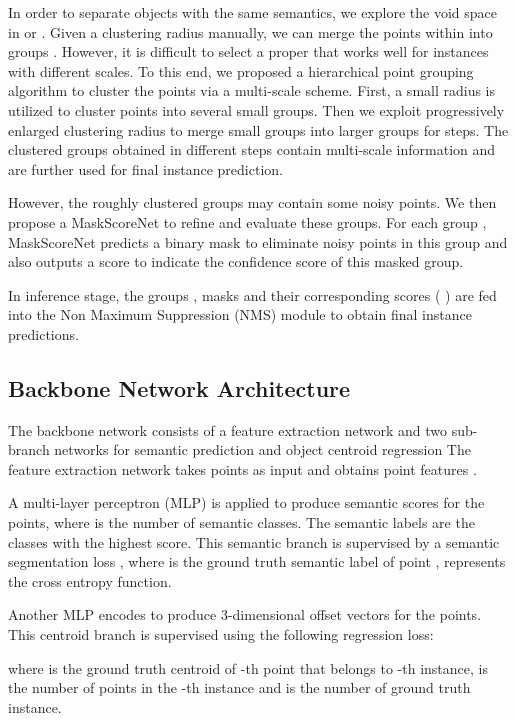 \documentclass{article}
\begin{document}
In order to separate objects with the same semantics, we explore the void space in  or .
Given a clustering radius  manually, we can merge the points within  into  groups .
However, it is difficult to select a proper  that works well for instances with different scales. 
To this end, we proposed a hierarchical point grouping algorithm to cluster the points via a multi-scale scheme. 
First, a small radius is utilized to cluster points into several small groups. Then we exploit progressively enlarged clustering radius to merge small groups into larger groups for   steps. 
The clustered groups  obtained in different steps contain multi-scale information and are further used for final instance prediction.

However, the roughly clustered groups  may contain some noisy points.
We then propose a MaskScoreNet to refine and evaluate these groups.
For each group , MaskScoreNet predicts a binary mask  to eliminate noisy points in this group and also outputs a score  to indicate the confidence score of this masked group.

In inference stage, the groups , masks  and their corresponding scores  ( ) are fed into the Non Maximum Suppression (NMS) module to obtain final instance predictions.

\subsection{Backbone Network Architecture}

The backbone network consists of a feature extraction network and two sub-branch networks for semantic prediction and object centroid regression
The feature extraction network takes points  as input and obtains point features .

A multi-layer perceptron (MLP) is applied to produce semantic scores  for the  points, where  is the number of semantic classes.
The semantic labels   are the classes with the highest score.
This semantic branch is supervised by a semantic segmentation loss , 
where  is the ground truth semantic label of point ,  represents the cross entropy function.

Another MLP encodes  to produce 3-dimensional offset vectors  for the  points.
This centroid branch is supervised using the following   regression loss:

where  is the ground truth centroid of -th point that belongs to -th instance,  is the number of points in the -th instance and  is the number of ground truth instance.
\end{document}
